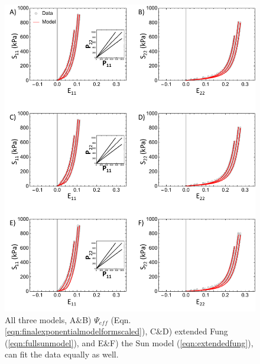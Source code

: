 	
\begin{figure}[!hbtp]
\centering
\includegraphics[width=\textwidth]{Images/chapter5/modelsfit}
\caption{All three models, A\&B) $\Psi_{eff}$ (Eqn. \ref{eqn:finalexponentialmodelformscaled}), C\&D) extended Fung (\ref{eqn:fullsunmodel}), and E\&F) the Sun model (\ref{eqn:extendedfung}), can fit the data equally as well.}
\label{fig:modelsfit}
\end{figure} 

